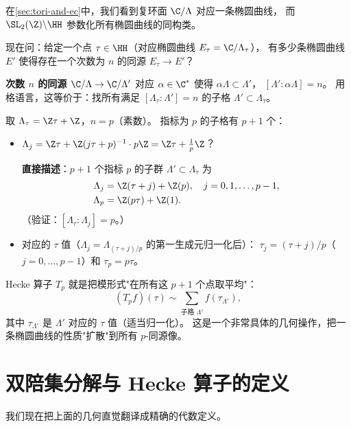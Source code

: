在\cref{sec:tori-and-ec}中，我们看到复环面 $\C/\Lambda$ 对应一条椭圆曲线，
而 $\SL_2(\Z) \backslash \HH$ 参数化所有椭圆曲线的同构类。

现在问：给定一个点 $\tau \in \HH$（对应椭圆曲线 $E_\tau = \C/\Lambda_\tau$），
有多少条椭圆曲线 $E'$ 使得存在一个次数为 $n$ 的同源 $E_\tau \to E'$？

\textbf{次数 $n$ 的同源 $\C/\Lambda \to \C/\Lambda'$}
对应 $\alpha \in \C^*$ 使得 $\alpha\Lambda \subset \Lambda'$，
$[\Lambda' : \alpha\Lambda] = n$。
用格语言，这等价于：找所有满足 $[\Lambda_\tau : \Lambda'] = n$ 的子格 $\Lambda' \subset \Lambda_\tau$。

\begin{example}[$n=p$（素数）时的子格]
\label{ex:sublattices-prime}
取 $\Lambda_\tau = \Z\tau + \Z$，$n = p$（素数）。
指标为 $p$ 的子格有 $p + 1$ 个：
\begin{itemize}
  \item $\Lambda_j = \Z\tau + \Z(j\tau + p)^{-1}\cdot p\Z = \Z\tau + \frac{1}{p}\Z$？

    \textbf{直接描述}：$p+1$ 个指标 $p$ 的子群 $\Lambda' \subset \Lambda_\tau$ 为
    \begin{align*}
      \Lambda_j &= \Z(\tau + j) + \Z(p), \quad j = 0, 1, \ldots, p-1, \\
      \Lambda_p &= \Z(p\tau) + \Z(1).
    \end{align*}
    （验证：$[\Lambda_\tau : \Lambda_j] = p$。）
  \item 对应的 $\tau$ 值（$\Lambda_j = \Lambda_{(τ+j)/p}$ 的第一生成元归一化后）：
    $\tau_j = (\tau + j)/p$（$j = 0, \ldots, p-1$）和 $\tau_p = p\tau$。
\end{itemize}
\end{example}

Hecke 算子 $T_p$ 就是把模形式"在所有这 $p+1$ 个点取平均"：
\[
  (T_p f)(\tau) \sim \sum_{\text{子格 } \Lambda'} f(\tau_{\Lambda'}),
\]
其中 $\tau_{\Lambda'}$ 是 $\Lambda'$ 对应的 $\tau$ 值（适当归一化）。
这是一个非常具体的几何操作，把一条椭圆曲线的性质"扩散"到所有 $p$-同源像。


\section{双陪集分解与 Hecke 算子的定义}
\label{sec:double-coset}

我们现在把上面的几何直觉翻译成精确的代数定义。

